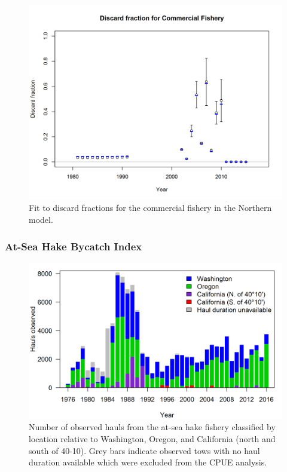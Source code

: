 \documentclass[12pt,]{article}
\begin{document}
\FloatBarrier

\newpage

\begin{figure}[htbp]
\centering
\includegraphics{./tex2pdf.8516/655472d5c8d6ebf599a75c26e147eee790f80f06.png}
\caption{Fit to discard fractions for the commercial fishery in the
Northern model.\label{fig:r4ss_discard_fits.N}}
\end{figure}

\FloatBarrier

\newpage

\subsubsection{At-Sea Hake Bycatch
Index}\label{at-sea-hake-bycatch-index}

\begin{figure}[htbp]
\centering
\includegraphics{Figures/ASHOP_hauls_observed_by_state.png}
\caption{Number of observed hauls from the at-sea hake fishery
classified by location relative to Washington, Oregon, and California
(north and south of 40-10). Grey bars indicate observed tows with no
haul duration available which were excluded from the CPUE
analysis.\label{fig:ASHOP_X1}}
\end{figure}
\end{document}
